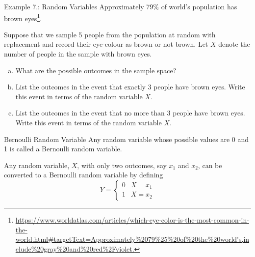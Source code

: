 \documentclass[aspectratio=169,xcolor=pdftex,dvipsnames,table]{beamer}\usepackage[]{graphicx}\usepackage[]{xcolor}
\newcounter{example}
\renewcommand{\example}
{\stepcounter{example}Example \lecturenum.\arabic{example}}
\newcommand{\lecturenum}{7}
\begin{document}
\begin{frame}

  \begin{block}{\example: Random Variables}
    Approximately 79\% of world's population has brown eyes\footnote{\url{https://www.worldatlas.com/articles/which-eye-color-is-the-most-common-in-the-world.html\#targetText=Approximately\%2079\%25\%20of\%20the\%20world's,include\%20gray\%20and\%20red\%2Fviolet.}}. 
    
    \bigskip
    
    Suppose that we sample 5 people from the population at random with replacement and record their eye-colour as brown or not brown. Let $X$ denote the number of people in the sample with brown eyes. 
    \begin{enumerate}[a)]
    \item What are the possible outcomes in the sample space?
    \item List the outcomes in the event that exactly 3 people have brown eyes. Write this event in terms of the random variable $X$.
    \item List the outcomes in the event that no more than 3 people have brown eyes. Write this event in terms of the random variable $X$.
    \end{enumerate}
  \end{block}
\end{frame}

\begin{frame}

  \begin{block}{Bernoulli Random Variable}
    Any random variable whose possible values are 0 and 1 is called a Bernoulli random variable.
    
    \medskip
    
    Any random variable, $X$, with only two outcomes, say $x_1$ and $x_2$, can be converted to a Bernoulli random variable by defining
    \[
      Y=\left\{
        \begin{array}{ll}
          0 & X=x_1\\
          1 & X=x_2
        \end{array}
      \right.
    \]
  \end{block}
\end{frame}
\end{document}
